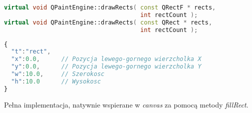 \begin{lstlisting}[language=C++,numbers=none]
virtual void QPaintEngine::drawRects( const QRectF * rects, 
                                      int rectCount );
virtual void QPaintEngine::drawRects( const QRect * rects, 
                                      int rectCount );
\end{lstlisting}
\begin{lstlisting}[language=JavaScript,numbers=none]
{
  "t":"rect",
  "x":0.0,      // Pozycja lewego-gornego wierzcholka X
  "y":0.0,      // Pozycja lewego-gornego wierzcholka Y
  "w":10.0,     // Szerokosc
  "h":10.0      // Wysokosc
}
\end{lstlisting}

Pełna implementacja, natywnie wspierane w \emph{canvas} za pomocą metody \emph{fillRect}.